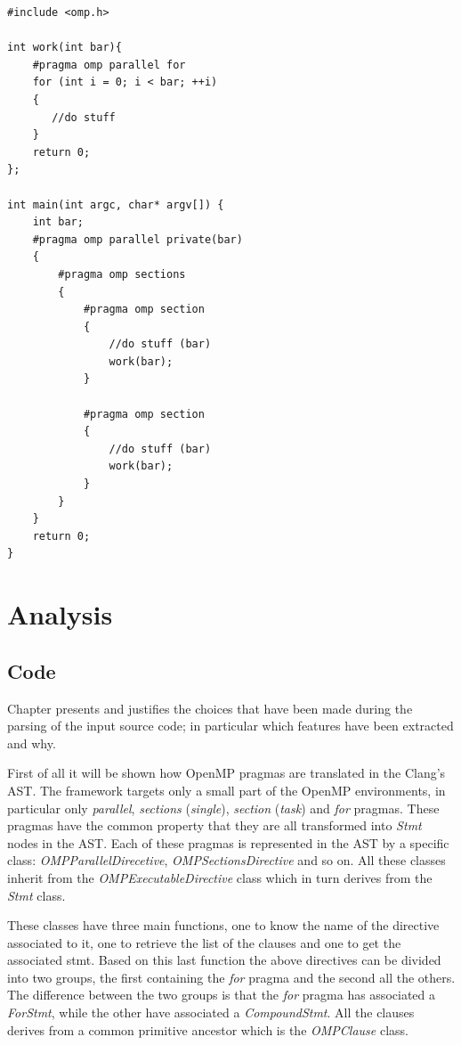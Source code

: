\documentclass[a4paper,12pt,oneside]{book}
\begin{document}
\begin{lstlisting}[language=CCC, caption=Sample code, label=code]
#include <omp.h>

int work(int bar){
    #pragma omp parallel for
    for (int i = 0; i < bar; ++i)
    {
       //do stuff
    }  
    return 0;
};

int main(int argc, char* argv[]) {
    int bar;
    #pragma omp parallel private(bar)
    {
        #pragma omp sections
        {
            #pragma omp section
            {   
                //do stuff (bar)
                work(bar);
            }
            
            #pragma omp section
            {
                //do stuff (bar)
                work(bar);
            }
        }
    }
    return 0;
}

\end{lstlisting}


\section{Analysis}
\subsection{Code}
\label{patch}
Chapter presents and justifies the choices that have been made during the parsing of the input source code; in particular which features have been extracted and why.

First of all it will be shown how OpenMP pragmas are translated in the Clang’s AST. The framework targets only a small part of the OpenMP environments, in particular only \emph{parallel}, \emph{sections} (\emph{single}), \emph{section} (\emph{task}) and \emph{for} pragmas. These pragmas have the common property that they are all transformed into \emph{Stmt} nodes in the AST. Each of these pragmas is represented in the AST by a specific class: \emph{OMPParallelDirecetive}, \emph{OMPSectionsDirective} and so on. All these classes inherit from the \emph{OMPExecutableDirective} class which in turn derives from the \emph{Stmt} class. 

These classes have three main functions, one to know the name of the directive associated to it, one to retrieve the list of the clauses and one to get the associated stmt. Based on this last function the above directives can be divided into two groups, the first containing the \emph{for} pragma and the second all the others. The difference between the two groups is that the \emph{for} pragma has associated a \emph{ForStmt}, while the other have associated a \emph{CompoundStmt}. All the clauses derives from a common primitive ancestor which is the \emph{OMPClause} class. 
\end{document}
